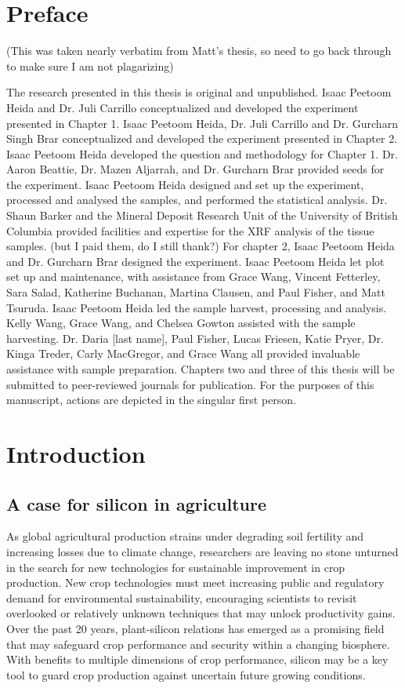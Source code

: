\documentclass[12pt, letterpaper, ]{article}
\begin{document}
\section{Preface}

(This was taken nearly verbatim from Matt's thesis, so need to go back through to make sure I am not plagarizing)

The research presented in this thesis is original and unpublished. Isaac Peetoom Heida and Dr. Juli Carrillo conceptualized and developed the experiment presented in Chapter 1. Isaac Peetoom Heida, Dr. Juli Carrillo and Dr. Gurcharn Singh Brar conceptualized and developed the experiment presented in Chapter 2.
Isaac Peetoom Heida developed the question and methodology for Chapter 1. Dr. Aaron Beattie, Dr. Mazen Aljarrah, and Dr. Gurcharn Brar provided seeds for the experiment. Isaac Peetoom Heida designed and set up the experiment, processed and analysed the samples, and performed the statistical analysis. Dr. Shaun Barker and the Mineral Deposit Research Unit of the University of British Columbia provided facilities and expertise for the XRF analysis of the tissue samples. (but I paid them, do I still thank?)
For chapter 2, Isaac Peetoom Heida and Dr. Gurcharn Brar designed the experiment. Isaac Peetoom Heida let plot set up and maintenance, with assistance from Grace Wang, Vincent Fetterley, Sara Salad, Katherine Buchanan, Martina Clausen, and Paul Fisher, and Matt Tsuruda. Isaac Peetoom Heida led the sample harvest, processing and analysis. Kelly Wang, Grace Wang, and Chelsea Gowton assisted with the sample harvesting. Dr. Daria [last name], Paul Fisher, Lucas Friesen, Katie Pryer, Dr. Kinga Treder, Carly MacGregor, and Grace Wang all provided invaluable assistance with sample preparation. 
Chapters two and three of this thesis will be submitted to peer-reviewed journals for publication. For the purposes of this manuscript, actions are depicted in the singular first person. 
\section{Introduction}

\subsection{A case for silicon in agriculture}

As global agricultural production strains under degrading soil fertility and increasing losses due to climate change, researchers are leaving no stone unturned in the search for new technologies for sustainable improvement in crop production. New crop technologies must meet increasing public and regulatory demand for environmental sustainability, encouraging scientists to revisit overlooked or relatively unknown techniques that may unlock productivity gains. Over the past 20 years, plant-silicon relations has emerged as a promising field that may safeguard crop performance and security within a changing biosphere. With benefits to multiple dimensions of crop performance, silicon may be a key tool to guard crop production against uncertain future growing conditions. 
\end{document}
